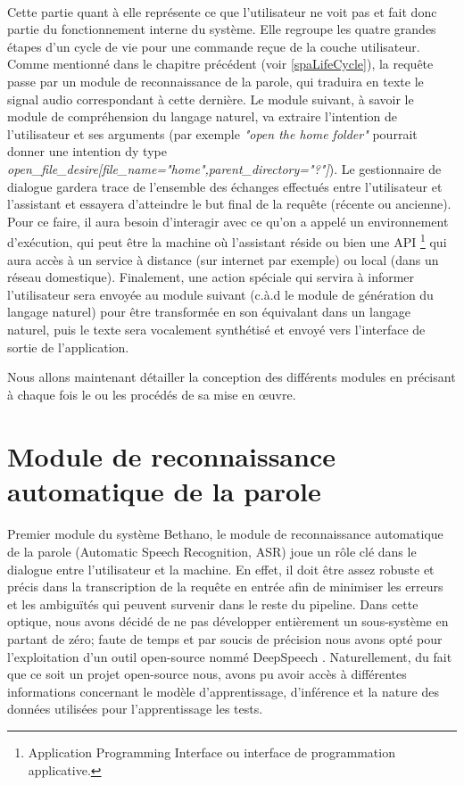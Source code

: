 	\paragraph{}
	\label{system_layer}
	Cette partie quant à elle représente ce que l'utilisateur ne voit pas et fait donc partie du fonctionnement interne du système. Elle regroupe les quatre grandes étapes d'un cycle de vie pour une commande reçue de la couche utilisateur. Comme mentionné dans le chapitre précédent (voir \ref{spaLifeCycle}), la requête passe par un module de reconnaissance de la parole, qui traduira en texte le signal audio correspondant à cette dernière. Le module suivant, à savoir le module de compréhension du langage naturel, va extraire l'intention de l'utilisateur et ses arguments (par exemple \textit{"open the home folder"} pourrait donner  une intention dy type  \textit{open\_file\_desire[file\_name="home",parent\_directory="?"]}). Le gestionnaire de dialogue gardera trace de l'ensemble des échanges effectués entre l'utilisateur et l'assistant et essayera d'atteindre le but final de la requête (récente ou ancienne). Pour ce faire, il aura besoin d'interagir avec ce qu'on a appelé un environnement d'exécution, qui peut être la machine où l'assistant réside ou bien une API \footnote{Application Programming Interface ou interface de programmation applicative.} qui aura accès à un service à distance (sur internet par exemple) ou local (dans un réseau domestique). Finalement, une action spéciale qui servira à informer l'utilisateur sera envoyée au module suivant (c.à.d le module de génération du langage naturel) pour être transformée en son équivalant dans un langage naturel, puis le texte sera vocalement synthétisé et envoyé vers l'interface de sortie de l'application.

	\par
	Nous allons maintenant détailler la conception des différents modules en précisant à chaque fois le ou les procédés de sa mise en \oe{}uvre. 
\section{Module de reconnaissance automatique de la parole}
\paragraph{}
\label{asr_probs}
Premier module du système Bethano, le module de reconnaissance automatique de la parole (Automatic Speech Recognition, ASR) joue un rôle clé dans le dialogue entre l'utilisateur et la machine. En effet, il doit être assez robuste et précis dans la transcription de la requête en entrée afin de minimiser les erreurs et les ambiguïtés qui peuvent survenir dans le reste du pipeline. Dans cette optique, nous avons décidé de ne pas développer entièrement un sous-système en partant de zéro; faute de temps et par soucis de précision nous avons opté pour l'exploitation d'un outil open-source nommé DeepSpeech \citep{deepspeech_paper}. Naturellement, du fait que ce soit un projet open-source nous, avons pu avoir accès à différentes informations concernant le modèle d'apprentissage, d'inférence et la nature des données utilisées pour l'apprentissage les tests.
